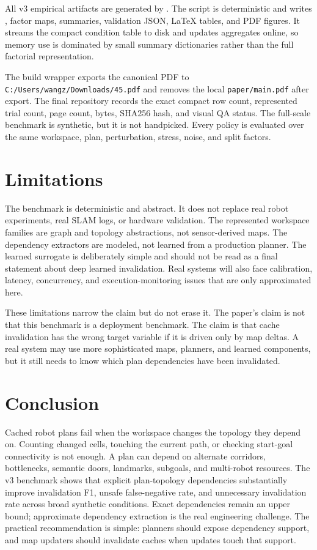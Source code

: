 \documentclass{article}
\begin{document}
All v3 empirical artifacts are generated by . The script is deterministic and writes , factor maps, summaries, validation JSON, LaTeX tables, and PDF figures. It streams the compact condition table to disk and updates aggregates online, so memory use is dominated by small summary dictionaries rather than the full factorial representation.

The build wrapper exports the canonical PDF to \texttt{C:/Users/wangz/Downloads/45.pdf} and removes the local \texttt{paper/main.pdf} after export. The final repository records the exact compact row count, represented trial count, page count, bytes, SHA256 hash, and visual QA status. The full-scale benchmark is synthetic, but it is not handpicked. Every policy is evaluated over the same workspace, plan, perturbation, stress, noise, and split factors.

\section{Limitations}

The benchmark is deterministic and abstract. It does not replace real robot experiments, real SLAM logs, or hardware validation. The represented workspace families are graph and topology abstractions, not sensor-derived maps. The dependency extractors are modeled, not learned from a production planner. The learned surrogate is deliberately simple and should not be read as a final statement about deep learned invalidation. Real systems will also face calibration, latency, concurrency, and execution-monitoring issues that are only approximated here.

These limitations narrow the claim but do not erase it. The paper's claim is not that this benchmark is a deployment benchmark. The claim is that cache invalidation has the wrong target variable if it is driven only by map deltas. A real system may use more sophisticated maps, planners, and learned components, but it still needs to know which plan dependencies have been invalidated.

\section{Conclusion}

Cached robot plans fail when the workspace changes the topology they depend on. Counting changed cells, touching the current path, or checking start-goal connectivity is not enough. A plan can depend on alternate corridors, bottlenecks, semantic doors, landmarks, subgoals, and multi-robot resources. The v3 benchmark shows that explicit plan-topology dependencies substantially improve invalidation F1, unsafe false-negative rate, and unnecessary invalidation rate across broad synthetic conditions. Exact dependencies remain an upper bound; approximate dependency extraction is the real engineering challenge. The practical recommendation is simple: planners should expose dependency support, and map updaters should invalidate caches when updates touch that support.
\end{document}
